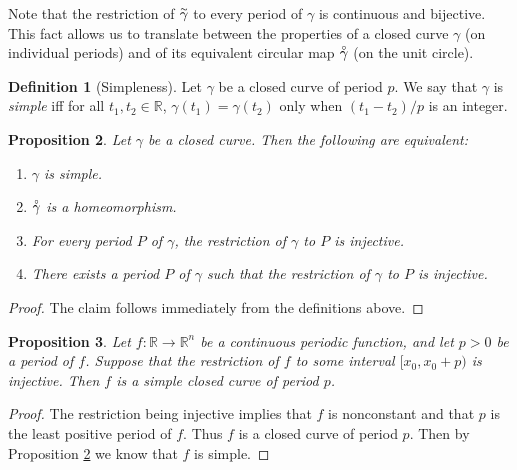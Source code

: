 \documentclass{amsart}
\newtheorem{proposition}{Proposition}[section]
\theoremstyle{definition}
\newtheorem{definition}[proposition]{Definition}
\theoremstyle{remark}
\newcommand{\lring}[1]{\accentset{\circ}{#1}}
\newcommand{\ltilde}[1]{\accentset{\sim}{#1}}
\begin{document}
Note that the restriction of $\ltilde{\gamma}$ to
every period of $\gamma$ is continuous and bijective.
This fact allows us to translate between
the properties of a closed curve $\gamma$
(on individual periods) and of its equivalent circular map
$\lring{\gamma}$ (on the unit circle).

\begin{definition}[Simpleness]
    Let $\gamma$ be a closed curve of period $p$.
    We say that $\gamma$ is \emph{simple}
    iff for all $t_1,t_2\in\mathbb{R}$, $\gamma(t_1)=\gamma(t_2)$
    only when $(t_1-t_2)/p$ is an integer.
\end{definition}

\begin{proposition}
    \label{pro:simple_equiv}
    Let $\gamma$ be a closed curve.
    Then the following are equivalent:
    \begin{enumerate}
        \item $\gamma$ is simple.
        \item $\lring{\gamma}$ is a homeomorphism.
        \item For every period $P$ of $\gamma$, the restriction
              of $\gamma$ to $P$ is injective.
        \item There exists a period $P$ of $\gamma$ such that
              the restriction of $\gamma$ to $P$ is injective.
    \end{enumerate}
\end{proposition}

\begin{proof}
    The claim follows immediately from the definitions above.
\end{proof}

\begin{proposition}
    \label{pro:simple_suf_cond}
    Let $f:\mathbb{R}\to\mathbb{R}^n$
    be a continuous periodic function,
    and let $p>0$ be a period of $f$. Suppose that
    the restriction of $f$ to some interval $[x_0,x_0+p)$
    is injective.
    Then $f$ is a simple closed curve of period $p$.
\end{proposition}

\begin{proof}
    The restriction being injective implies that
    $f$ is nonconstant and that $p$ is the least positive
    period of $f$. Thus $f$ is a closed curve of period $p$.
    Then by Proposition \ref{pro:simple_equiv}
    we know that $f$ is simple.
\end{proof}
\end{document}
